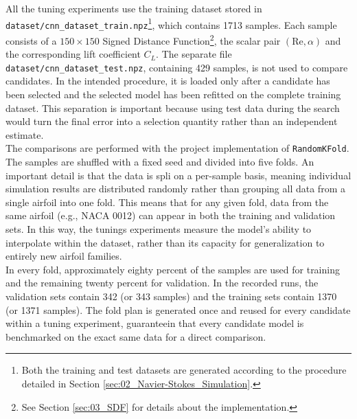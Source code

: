 All the tuning experiments use the training dataset stored in \texttt{dataset/cnn\_dataset\_train.npz}\footnote{Both the training and test datasets are generated according to the procedure detailed in Section \ref{sec:02_Navier-Stokes_Simulation}.}, which contains 1713 samples. Each sample consists of a $150\times150$ Signed Distance Function\footnote{See Section \ref{sec:03_SDF} for details about the implementation.}, the scalar pair $(\mathrm{Re},\alpha)$ and the corresponding lift coefficient $C_L$. The separate file \texttt{dataset/cnn\_dataset\_test.npz}, containing 429 samples, is not used to compare candidates. In the intended procedure, it is loaded only after a candidate has been selected and the selected model has been refitted on the complete training dataset. This separation is important because using test data during the search would turn the final error into a selection quantity rather than an independent estimate.\\

The comparisons are performed with the project implementation of \texttt{RandomKFold}. The samples are shuffled with a fixed seed and divided into five folds. An important detail is that the data is spli on a per-sample basis, meaning individual simulation results are distributed randomly rather than grouping all data from a single airfoil into one fold. This means that for any given fold, data from the same airfoil (e.g., NACA 0012) can appear in both the training and validation sets. In this way, the tunings experiments measure the model's ability to interpolate within the dataset, rather than its capacity for generalization to entirely new airfoil families.\\
In every fold, approximately eighty percent of the samples are used for training and the remaining twenty percent for validation. In the recorded runs, the validation sets contain 342 (or 343 samples) and the training sets contain 1370 (or 1371 samples). The fold plan is generated once and reused for every candidate within a tuning experiment, guaranteein that every candidate model is benchmarked on the exact same data for a direct comparison.\\

